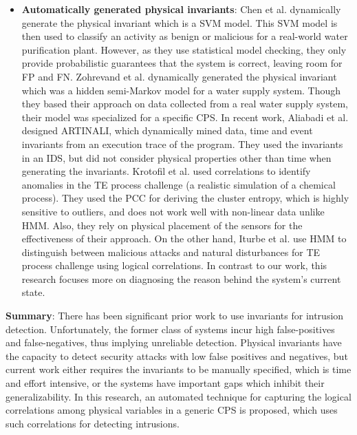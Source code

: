 \begin{itemize}
\item \textbf{Automatically generated physical invariants}: Chen et al. \cite{chen2018learning} dynamically generate the physical invariant which is a \ac{SVM} model. This \ac{SVM} model is then used to classify an activity as benign or malicious for a real-world water purification plant. However, as they use statistical model checking, they only provide probabilistic guarantees that the system is correct, leaving room for \acf{FP} and \acf{FN}. Zohrevand et al. \cite{zohrevand2016hidden} dynamically generated the physical invariant which was a hidden semi-Markov model for a water supply system. Though they based their approach on  data collected from a real water supply system, their model was specialized for a specific \ac{CPS}. In recent work, Aliabadi et al. \cite{aliabadi2017artinali} designed ARTINALI, which dynamically mined data, time and event invariants from an execution trace of the program. They used the invariants in an \ac{IDS}, but did not consider physical properties other than time when generating the invariants. Krotofil et al. \cite{krotofil2015process} used correlations to identify anomalies in the \ac{TE} process challenge (a realistic simulation of a chemical process). They used the \acf{PCC} for deriving the cluster entropy, which is highly sensitive to outliers, and does not work well with non-linear data unlike \ac{HMM}. Also, they rely on physical placement of the sensors for the effectiveness of their approach. On the other hand, Iturbe et al. \cite{iturbe2017feasibility} use \ac{HMM} to distinguish between malicious attacks and natural disturbances for \ac{TE} process challenge using logical correlations. In contrast to our work, this research focuses more on diagnosing the reason behind the system's current state. 
\end{itemize}

\textbf{Summary}: There has been significant prior work to use invariants for intrusion detection. Unfortunately, the former class of systems incur high false-positives and false-negatives, thus implying unreliable detection. Physical invariants have the capacity to detect security attacks with low false positives and negatives, but current work either requires the invariants to be manually specified, which is time and effort intensive, or the systems have important gaps which inhibit their generalizability. In this research, an automated technique for capturing the logical correlations among physical variables in a generic \ac{CPS} is proposed, which uses such correlations for detecting intrusions.

\endinput
